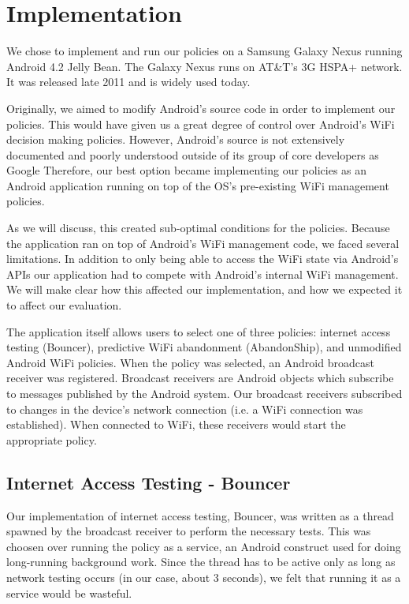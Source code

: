 \section{Implementation}
\label{sec:impl}

We chose to implement and run our policies on a Samsung Galaxy Nexus running Android 4.2 Jelly Bean. The Galaxy Nexus runs on AT\&T's 3G HSPA+ network. It was released late 2011 and is widely used today.

Originally, we aimed to modify Android's source code in order to implement our policies. This would have given us a great degree of control over Android's WiFi decision making policies. However, Android's source is not extensively documented and poorly understood outside of its group of core developers as Google \cite{Yaghmour:2013} Therefore, our best option became implementing our policies as an Android application running on top of the OS's pre-existing WiFi management policies.

As we will discuss, this created sub-optimal conditions for the policies. Because the application ran on top of Android's WiFi management code, we faced several limitations. In addition to only being able to access the WiFi state via Android's APIs our application had to compete with Android's internal WiFi management. We will make clear how this affected our implementation, and how we expected it to affect our evaluation.

The application itself allows users to select one of three policies: internet access testing (Bouncer), predictive WiFi abandonment (AbandonShip), and unmodified Android WiFi policies. When the policy was selected, an Android broadcast receiver was registered. Broadcast receivers are Android objects which subscribe to messages published by the Android system. Our broadcast receivers subscribed to changes in the device's network connection (i.e. a WiFi connection was established). When connected to WiFi, these receivers would start the appropriate policy.


\subsection{Internet Access Testing - Bouncer}
Our implementation of internet access testing, Bouncer, was written as a thread spawned by the broadcast receiver to perform the necessary tests. This was choosen over running the policy as a service, an Android construct used for doing long-running background work. Since the thread has to be active only as long as network testing occurs (in our case, about 3 seconds), we felt that running it as a service would be wasteful.

